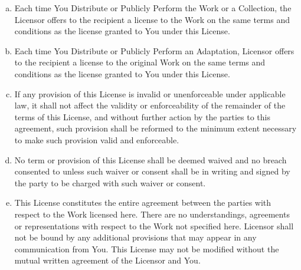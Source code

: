 \begin{enumerate}[a.]
          \item Each time You Distribute or Publicly Perform the Work
          or a Collection, the Licensor offers to the recipient a
          license to the Work on the same terms and conditions as
          the license granted to You under this License.

          \item Each time You Distribute or Publicly Perform an
          Adaptation, Licensor offers to the recipient a license to
          the original Work on the same terms and conditions as the
          license granted to You under this License.

          \item If any provision of this License is invalid or
          unenforceable under applicable law, it shall not affect
          the validity or enforceability of the remainder of the
          terms of this License, and without further action by the
          parties to this agreement, such provision shall be
          reformed to the minimum extent necessary to make such
          provision valid and enforceable.

          \item No term or provision of this License shall be deemed
          waived and no breach consented to unless such waiver or
          consent shall be in writing and signed by the party to be
          charged with such waiver or consent.

          \item This License constitutes the entire agreement between
          the parties with respect to the Work licensed here. There
          are no understandings, agreements or representations with
          respect to the Work not specified here. Licensor shall
          not be bound by any additional provisions that may appear
          in any communication from You. This License may not be
          modified without the mutual written agreement of the
          Licensor and You.


\end{enumerate}
